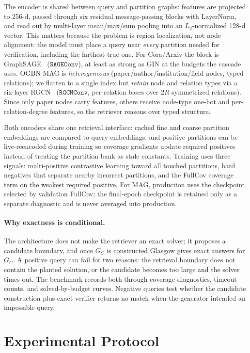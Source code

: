 \documentclass[runningheads]{llncs}
\begin{document}
The encoder is shared between query and partition graphs: features are projected to 256-d, passed through six residual message-passing blocks with LayerNorm, and read out by multi-layer mean/max/sum pooling into an $L_2$-normalized 128-d vector. This matters because the problem is region localization, not node alignment: the model must place a query near \emph{every} partition needed for verification, including the farthest true one. For Cora/Arxiv the block is GraphSAGE~\cite{ref_graphsage} ($\mathtt{SAGEConv}$), at least as strong as GIN at the budgets the cascade uses. OGBN-MAG is \emph{heterogeneous} (paper/author/institution/field nodes, typed relations); we flatten to a single index but \emph{retain} node and relation types via a six-layer RGCN~\cite{ref_rgcn} ($\mathtt{RGCNConv}$, per-relation bases over $2R$ symmetrized relations). Since only paper nodes carry features, others receive node-type one-hot and per-relation-degree features, so the retriever reasons over typed structure.

Both encoders share one retrieval interface: cached fine and coarse partition embeddings are compared to query embeddings, and positive partitions can be live-reencoded during training so coverage gradients update required positives instead of treating the partition bank as stale constants. Training uses three signals: multi-positive contrastive learning toward all touched partitions, hard negatives that separate nearby incorrect partitions, and the FullCov coverage term on the weakest required positive. For MAG, production uses the checkpoint selected by validation FullCov; the final-epoch checkpoint is retained only as a separate diagnostic and is never averaged into production.

\paragraph{Why exactness is conditional.}
The architecture does not make the retriever an exact solver; it proposes a candidate boundary, and once $G_C$ is constructed Glasgow gives exact answers for $G_C$. A positive query can fail for two reasons: the retrieval boundary does not contain the planted solution, or the candidate becomes too large and the solver times out. The benchmark records both through coverage diagnostics, timeout counts, and solved-by-budget curves. Negative queries test whether the candidate construction plus exact verifier returns no match when the generator intended an impossible query.

\section{Experimental Protocol}
\end{document}

